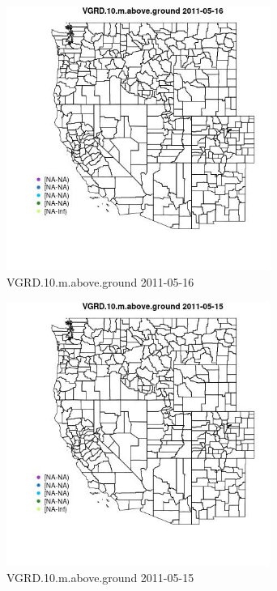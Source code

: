 \begin{figure} 
\centering  
\includegraphics[width=0.77\textwidth]{Code_Outputs/ML_input_report_ML_input_PM25_Step5_part_d_de_duplicated_aves_ML_input_MapObsVGRD10maboveground2011-05-16.jpg} 
\caption{\label{fig:ML_input_report_ML_input_PM25_Step5_part_d_de_duplicated_aves_ML_inputMapObsVGRD10maboveground2011-05-16}VGRD.10.m.above.ground 2011-05-16} 
\end{figure} 
 

\begin{figure} 
\centering  
\includegraphics[width=0.77\textwidth]{Code_Outputs/ML_input_report_ML_input_PM25_Step5_part_d_de_duplicated_aves_ML_input_MapObsVGRD10maboveground2011-05-15.jpg} 
\caption{\label{fig:ML_input_report_ML_input_PM25_Step5_part_d_de_duplicated_aves_ML_inputMapObsVGRD10maboveground2011-05-15}VGRD.10.m.above.ground 2011-05-15} 
\end{figure} 
 

